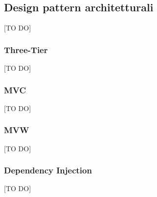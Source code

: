 %
%


\subsection{Design pattern architetturali} %
\label{sub:design_pattern_architetturali}
[TO DO]
	\subsubsection{Three-Tier} %
	\label{ssub:three_tier}
	[TO DO]

	\subsubsection{MVC} %
	\label{ssub:mvc}
	[TO DO]

	\subsubsection{MVW} %
	\label{ssub:mvw}
	[TO DO]

	\subsubsection{Dependency Injection} %
	\label{ssub:dependency_injection}
	[TO DO]
